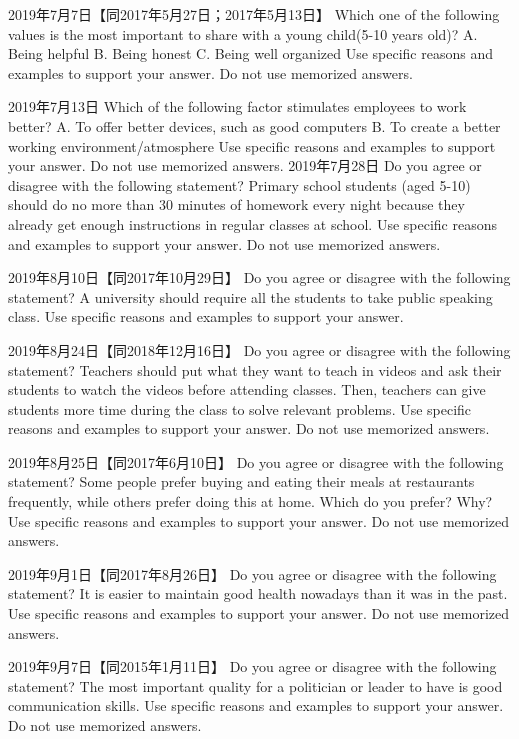 2019年7月7日【同2017年5月27日；2017年5月13日】
Which one of the following values is the most important to share with a young child(5-10 years old)?
A. Being helpful
B. Being honest
C. Being well organized
Use specific reasons and examples to support your answer. Do not use memorized answers.

2019年7月13日
Which of the following factor stimulates employees to work better?
A. To offer better devices, such as good computers
B. To create a better working environment/atmosphere
Use specific reasons and examples to support your answer. Do not use memorized answers.
2019年7月28日
Do you agree or disagree with the following statement?
Primary school students (aged 5-10) should do no more than 30 minutes of homework every night because they already get enough instructions in regular classes at school.
Use specific reasons and examples to support your answer. Do not use memorized answers.

2019年8月10日【同2017年10月29日】
Do you agree or disagree with the following statement?
A university should require all the students to take public speaking class.
Use specific reasons and examples to support your answer.

2019年8月24日【同2018年12月16日】
Do you agree or disagree with the following statement?
Teachers should put what they want to teach in videos and ask their students to watch the videos before attending classes. Then, teachers can give students more time during the class to solve relevant problems.
Use specific reasons and examples to support your answer. Do not use memorized answers.

2019年8月25日【同2017年6月10日】
Do you agree or disagree with the following statement?
Some people prefer buying and eating their meals at restaurants frequently, while others prefer doing this at home. Which do you prefer? Why?
Use specific reasons and examples to support your answer. Do not use memorized answers.

2019年9月1日【同2017年8月26日】
Do you agree or disagree with the following statement?
It is easier to maintain good health nowadays than it was in the past.
Use specific reasons and examples to support your answer. Do not use memorized answers.

2019年9月7日【同2015年1月11日】
Do you agree or disagree with the following statement?
The most important quality for a politician or leader to have is good communication skills.
Use specific reasons and examples to support your answer. Do not use memorized answers.







